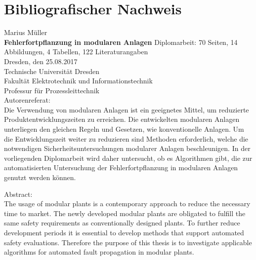 \chapter*{Bibliografischer Nachweis}
\thispagestyle{empty}
Marius M\"uller\\[2ex]
\textbf{Fehlerfortpflanzung in modularen Anlagen} \newline
Diplomarbeit: 70 Seiten, 14 Abbildungen, 4 Tabellen, 122 Literaturangaben\\
Dresden, den 25.08.2017 \\
Technische Universit\"at Dresden \\
Fakult\"at Elektrotechnik und Informationstechnik \\
Professur für Prozessleittechnik\\[2ex]
Autorenreferat:\\
Die Verwendung von modularen Anlagen ist ein geeignetes Mittel, um reduzierte Produktentwicklungszeiten zu erreichen. Die entwickelten modularen Anlagen unterliegen den gleichen Regeln und Gesetzen, wie konventionelle Anlagen. Um die Entwicklungszeit weiter zu reduzieren sind Methoden erforderlich, welche die notwendigen Sicherheitsuntersuchungen modularer Anlagen beschleunigen. In der vorliegenden Diplomarbeit wird daher untersucht, ob es Algorithmen gibt, die zur automatisierten Untersuchung der Fehlerfortpflanzung in modularen Anlagen genutzt werden k\"onnen.

Abstract:\\
The usage of modular plants is a contemporary approach to reduce the necessary time to market. The newly developed modular plants are obligated to fulfill the same safety requirements as conventionally designed plants. To further reduce development periods it is essential to develop methods that support automated safety evaluations. Therefore the purpose of this thesis is to investigate applicable algorithms for automated fault propagation in modular plants. 

